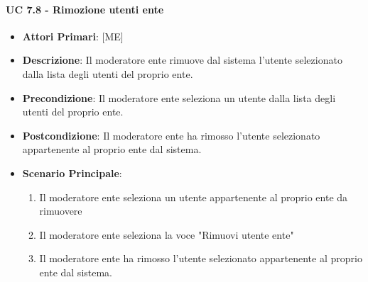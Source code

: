 			\paragraph{UC 7.8 - Rimozione utenti ente}
			\begin{itemize}
				\item \textbf{Attori Primari}: [ME]
				\item \textbf{Descrizione}: Il moderatore ente rimuove dal sistema l'utente selezionato dalla lista degli utenti del proprio ente.
				\item \textbf{Precondizione}: Il moderatore ente seleziona un utente dalla lista degli utenti del proprio ente.
				\item \textbf{Postcondizione}: Il moderatore ente ha rimosso l'utente selezionato appartenente al proprio ente dal sistema.
				\item \textbf{Scenario Principale}:
				\begin{enumerate}
					\item{Il moderatore ente seleziona un utente appartenente al proprio ente da rimuovere}
					\item{Il moderatore ente seleziona la voce "Rimuovi utente ente"}
					\item{Il moderatore ente ha rimosso l'utente selezionato appartenente al proprio ente dal sistema.}
				\end{enumerate}		
			\end{itemize}